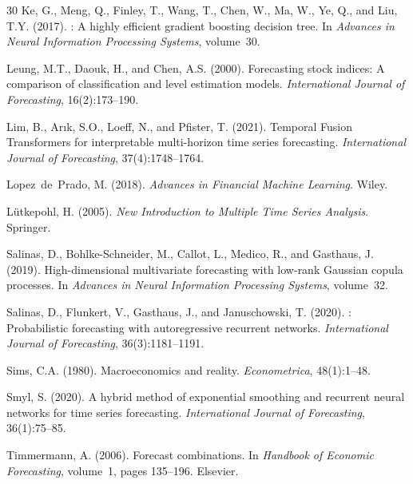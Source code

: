 \documentclass[11pt,a4paper,twocolumn]{article}
\begin{document}
\begin{thebibliography}{30}
Ke, G., Meng, Q., Finley, T., Wang, T., Chen, W., Ma, W., Ye, Q., and Liu,
  T.Y. (2017).
: A highly efficient gradient boosting decision tree.
\newblock In \emph{Advances in Neural Information Processing Systems}, volume~30.

Leung, M.T., Daouk, H., and Chen, A.S. (2000).
\newblock Forecasting stock indices: A comparison of classification and level
  estimation models.
\newblock \emph{International Journal of Forecasting}, 16(2):173--190.

Lim, B., Ar{\i}k, S.O., Loeff, N., and Pfister, T. (2021).
\newblock Temporal {F}usion {T}ransformers for interpretable multi-horizon time
  series forecasting.
\newblock \emph{International Journal of Forecasting}, 37(4):1748--1764.

Lopez~de~Prado, M. (2018).
\newblock \emph{Advances in Financial Machine Learning}.
\newblock Wiley.

L{\"u}tkepohl, H. (2005).
\newblock \emph{New Introduction to Multiple Time Series Analysis}.
\newblock Springer.

Salinas, D., Bohlke-Schneider, M., Callot, L., Medico, R., and Gasthaus, J.
  (2019).
\newblock High-dimensional multivariate forecasting with low-rank {G}aussian
  copula processes.
\newblock In \emph{Advances in Neural Information Processing Systems},
  volume~32.

Salinas, D., Flunkert, V., Gasthaus, J., and Januschowski, T. (2020).
: Probabilistic forecasting with autoregressive recurrent
  networks.
\newblock \emph{International Journal of Forecasting}, 36(3):1181--1191.

Sims, C.A. (1980).
\newblock Macroeconomics and reality.
\newblock \emph{Econometrica}, 48(1):1--48.

Smyl, S. (2020).
\newblock A hybrid method of exponential smoothing and recurrent neural
  networks for time series forecasting.
\newblock \emph{International Journal of Forecasting}, 36(1):75--85.

Timmermann, A. (2006).
\newblock Forecast combinations.
\newblock In \emph{Handbook of Economic Forecasting}, volume~1, pages 135--196.
  Elsevier.

\end{thebibliography}
\end{document}
